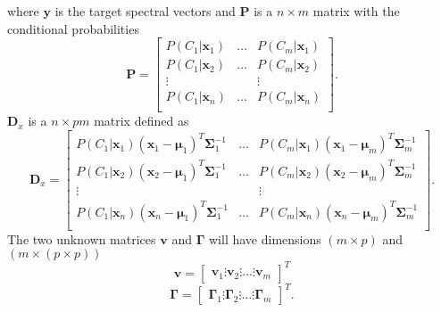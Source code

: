 where $\mathbf{y}$ is the target spectral vectors and $\mathbf{P}$ is a $n \times m$ matrix with the conditional probabilities
\begin{equation}
	\label{eq:P_matrix}
	\mathbf{P} = \begin{bmatrix}
		P(C_1\vert \mathbf{x}_1) & \dots & P(C_m\vert \mathbf{x}_1) \\
		P(C_1\vert \mathbf{x}_2) & \dots & P(C_m\vert \mathbf{x}_2) \\
		\vdots & & \vdots \\
		P(C_1\vert \mathbf{x}_n) & \dots & P(C_m\vert \mathbf{x}_n) \\
	\end{bmatrix}.
\end{equation}
$\mathbf{D}_x$ is a $n \times pm$ matrix defined as
\begin{equation}
	\label{eq:D_matrix}
	\mathbf{D}_x = \begin{bmatrix}
		P(C_1\vert \mathbf{x}_1)(\mathbf{x}_1 - \boldsymbol{\mu}_1)^T\mathbf{\Sigma}_1^{-1} & \dots & P(C_m\vert \mathbf{x}_1)(\mathbf{x}_1 - \boldsymbol{\mu}_m)^T\mathbf{\Sigma}_m^{-1} \\
		P(C_1\vert \mathbf{x}_2)(\mathbf{x}_2 - \boldsymbol{\mu}_1)^T\mathbf{\Sigma}_1^{-1} & \dots & P(C_m\vert \mathbf{x}_2)(\mathbf{x}_2 - \boldsymbol{\mu}_m)^T\mathbf{\Sigma}_m^{-1} \\
		\vdots & & \vdots \\
		P(C_1\vert \mathbf{x}_n)(\mathbf{x}_n - \boldsymbol{\mu}_1)^T\mathbf{\Sigma}_1^{-1} & \dots & P(C_m\vert \mathbf{x}_n)(\mathbf{x}_n - \boldsymbol{\mu}_m)^T\mathbf{\Sigma}_m^{-1} \\
	\end{bmatrix}.
\end{equation}
The two unknown matrices $\mathbf{v}$ and $ \mathbf{\Gamma}$ will have dimensions $(m\times p)$ and $( m \times (p\times p))$ 
\begin{equation}
	\label{eq:v_matrix}
	\mathbf{v} = 
	\begin{bmatrix}
		\mathbf{v}_1 \vdots \mathbf{v}_2 \vdots \dots \vdots \mathbf{v}_m
	\end{bmatrix}^T
\end{equation}
\begin{equation}
	\label{gamma_matrix}
	\mathbf{\Gamma} = 
	\begin{bmatrix}
		\mathbf{\Gamma}_1 \vdots \mathbf{\Gamma}_2 \vdots \dots \vdots \mathbf{\Gamma}_m
	\end{bmatrix}^T.
\end{equation}
